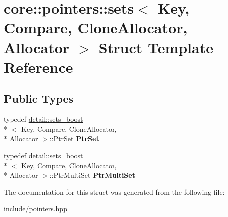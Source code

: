 \hypertarget{structcore_1_1pointers_1_1sets}{\section{core\-:\-:pointers\-:\-:sets$<$ Key, Compare, Clone\-Allocator, Allocator $>$ Struct Template Reference}
\label{structcore_1_1pointers_1_1sets}
}
\subsection*{Public Types}
\begin{DoxyCompactItemize}
\item 
\hypertarget{structcore_1_1pointers_1_1sets_a22be36c78d87ed6706914fe68099731d}{typedef \hyperlink{structcore_1_1pointers_1_1detail_1_1sets__boost}{detail\-::sets\-\_\-boost}\\*
$<$ Key, Compare, Clone\-Allocator, \\*
Allocator $>$\-::Ptr\-Set {\bfseries Ptr\-Set}}\label{structcore_1_1pointers_1_1sets_a22be36c78d87ed6706914fe68099731d}

\item 
\hypertarget{structcore_1_1pointers_1_1sets_a99b23ef683f0fd5771b93452480a1149}{typedef \hyperlink{structcore_1_1pointers_1_1detail_1_1sets__boost}{detail\-::sets\-\_\-boost}\\*
$<$ Key, Compare, Clone\-Allocator, \\*
Allocator $>$\-::Ptr\-Multi\-Set {\bfseries Ptr\-Multi\-Set}}\label{structcore_1_1pointers_1_1sets_a99b23ef683f0fd5771b93452480a1149}

\end{DoxyCompactItemize}


The documentation for this struct was generated from the following file\-:\begin{DoxyCompactItemize}
\item 
include/pointers.\-hpp\end{DoxyCompactItemize}
